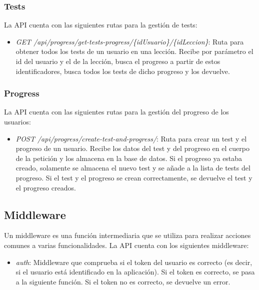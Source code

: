 \subsubsection{Tests}
\label{sec:tests}
La API cuenta con las siguientes rutas para la gestión de tests:

\begin{itemize}
  \item \textit{GET /api/progress/get-tests-progress/\{idUsuario\}/\{idLeccion\}}: Ruta para obtener todos los tests de un usuario en una lección. Recibe por parámetro el id del usuario y el de la lección, busca el progreso a partir de estos identificadores, busca todos los tests de dicho progreso y los devuelve.
\end{itemize}


\subsubsection{Progress}
\label{sec:progress}
La API cuenta con las siguientes rutas para la gestión del progreso de los usuarios:

\begin{itemize}
  \item \textit{POST /api/progress/create-test-and-progress/}: Ruta para crear un test y el progreso de un usuario. Recibe los datos del test y del progreso en el cuerpo de la petición y los almacena en la base de datos. Si el progreso ya estaba creado, solamente se almacena el nuevo test y se añade a la lista de tests del progreso. Si el test y el progreso se crean correctamente, se devuelve el test y el progreso creados. 
\end{itemize}




\subsection{Middleware}
\label{sec:middleware}
Un middleware es una función intermediaria que se utiliza para realizar acciones comunes a varias funcionalidades. La API cuenta con los siguientes middleware:

\begin{itemize}
  \item \textit{auth}: Middleware que comprueba si el token del usuario es correcto (es decir, si el usuario está identificado en la aplicación).
   Si el token es correcto, se pasa a la siguiente función. Si el token no es correcto, se devuelve un error.
\end {itemize}

